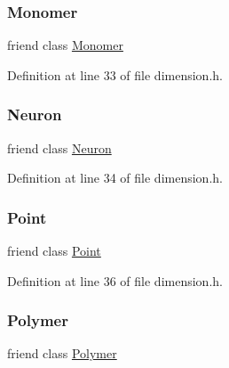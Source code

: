 \subsubsection{\texorpdfstring{Monomer}{Monomer}}
{\footnotesize\ttfamily friend class \hyperlink{class_monomer}{Monomer}\hspace{0.3cm}{\ttfamily [friend]}}



Definition at line 33 of file dimension.\+h.

\mbox{\label{class_dimension_aa410d74ba34b18a9f6bdf24323c4ee5b}} 
\subsubsection{\texorpdfstring{Neuron}{Neuron}}
{\footnotesize\ttfamily friend class \hyperlink{class_neuron}{Neuron}\hspace{0.3cm}{\ttfamily [friend]}}



Definition at line 34 of file dimension.\+h.

\mbox{\label{class_dimension_aa238d52f825b8ea8da6a5c4ae1b8d482}} 
\subsubsection{\texorpdfstring{Point}{Point}}
{\footnotesize\ttfamily friend class \hyperlink{class_point}{Point}\hspace{0.3cm}{\ttfamily [friend]}}



Definition at line 36 of file dimension.\+h.

\mbox{\label{class_dimension_ae64ddc1700c5abc4106cbcc5843a4a42}} 
\subsubsection{\texorpdfstring{Polymer}{Polymer}}
{\footnotesize\ttfamily friend class \hyperlink{class_polymer}{Polymer}\hspace{0.3cm}{\ttfamily [friend]}}



